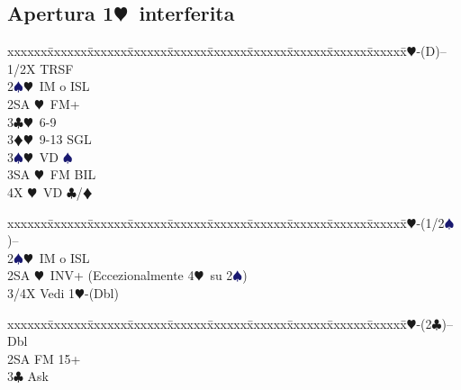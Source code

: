\documentclass[a4paper,italian]{article}
\newcommand{\BC}{\textcolor{OliveGreen}{$\clubsuit$}}
\newcommand{\BD}{\textcolor{RedOrange}{$\vardiamondsuit$}}
\newcommand{\BH}{\textcolor{Red2}{$\varheartsuit${}}}
\newcommand{\BS}{\textcolor{MidnightBlue}{$\spadesuit${}}}
\newcommand{\pdfh}{\texorpdfstring{\BH{}}{H}}
\newenvironment{bidtable}
{\begin{tabbing}

    xxxxxx\=xxxxxx\=xxxxxx\=xxxxxx\=xxxxxx\=xxxxxx\=xxxxxx\=xxxxxx\=xxxxxx\=xxxxxx\=\kill}
{\end{tabbing} }%
\begin{document}
                                    \begin{multicols}{2}
                                        \subsection{Apertura 1\pdfh\ interferita}

                                        \begin{bidtable}
                                            1\BH-(D)--\+\\
                                            1/2X \> TRSF\\
                                            2\BS {}\BH\ IM o ISL\\
                                            2SA \BH\ FM+\\
                                            3\BC {}\BH\ 6-9\\
                                            3\BD {}\BH\ 9-13 SGL\\
                                            3\BS {}\BH\ VD \BS \\
                                            3SA \BH\ FM BIL\\
                                            4X \BH\ VD \BC /\BD \-
                                        \end{bidtable}
                                        \bigbreak
                                        \begin{bidtable}
                                            1\BH-(1/2\BS)--\+\\
                                            2\BS {}\BH\ IM o ISL\\
                                            2SA \BH\ INV+ (Eccezionalmente 4\BH\ su 2\BS )\\
                                            3/4X \> Vedi 1\BH -(Dbl)\-
                                        \end{bidtable}
                                        \bigbreak
                                        \begin{bidtable}
                                            1\BH-(2\BC)--\+\\
                                            Dbl\+\\
                                            2SA \> FM 15+\+\\
                                            3\BC \> Ask\+\\

\end{bidtable}
\end{multicols}
\end{document}
